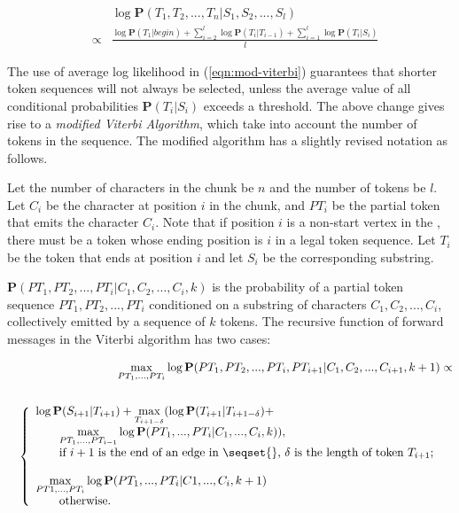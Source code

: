 \begin{eqnarray}
&& \log \mathbf{P}(T_1, T_2, ..., T_n|S_1, S_2, ..., S_l) \nonumber \\ 
& \propto & \frac{\log \mathbf{P}(T_1|begin) +
\sum_{i=2}^{l}\log \mathbf{P}(T_i|T_{i-1}) + 
\sum_{i=1}^{l}\log \mathbf{P}(T_i|S_i)}{l}\label{eqn:mod-viterbi}
\end{eqnarray}

The use of average log likelihood in (\ref{eqn:mod-viterbi}) 
guarantees that shorter token sequences
will not always be selected, unless the average value of all conditional
probabilities $\mathbf{P}(T_i|S_i)$ exceeds a threshold.
The above change gives rise to a {\em modified Viterbi Algorithm},
which take into account the number of tokens in the sequence.
The modified algorithm has a slightly revised notation as follows. 

Let the number of characters in the chunk be $n$ and the number of tokens be $l$. 
Let $C_i$ be the character at position $i$ in the chunk, and 
$PT_i$ be the partial token that emits the character $C_i$. 
Note that if position $i$ is a non-start vertex in the \seqset{}, 
there must be a token whose ending position is
$i$ in a legal token sequence. Let $T_i$ be the token
that ends at position $i$ and let $S_i$ be the corresponding substring. 

$\mathbf{P}(PT_1, PT_2, ..., PT_i|C_1, C_2, ..., C_i, k)$ is the
probability of a partial token sequence $PT_1, PT_2, ..., PT_i$
conditioned on a substring of characters $C_1, C_2, ..., C_i$,
collectively emitted by a sequence of $k$ tokens.
The recursive function of forward messages in the Viterbi algorithm 
has two cases:

\begin{eqnarray} 
&&\displaystyle{\max_{PT_1, ..., PT_i}}\log\mathbf{P}(PT_1, PT_2, ..., PT_i,
PT_{i+1}|C_1, C_2, ..., C_{i+1}, k+1) \propto \nonumber \\
&& \nonumber \\
&&\left\{
  \begin{array}{ll}
    \log \mathbf{P}(S_{i+1}|T_{i+1}) + 
    \displaystyle{\max_{T_{i+1-\delta}}}(\log\mathbf{P}(T_{i+1}|T_{i+1-\delta}) + \\
    \qquad \displaystyle{\max_{PT_1, ..., PT_{i-1}}}\log\mathbf{P}(PT_1, ..., PT_i|C_1, ..., C_i, k)), 
& \\ 
  \qquad \hbox{if $i+1$ is the end of an edge in \seqset{},
  $\delta$ is the length of token $T_{i+1}$;} \\\\
    \displaystyle{\max_{PT1, ..., PT_i}}\log\mathbf{P}(PT_1, ..., PT_i|C1, ...,
  C_i, k+1) \\
\qquad \hbox{otherwise.}
  \end{array}
\right. \label{eqn-forward}
\end{eqnarray}

